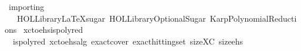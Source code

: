 %
\begin{isabellebody}%
%
%
\isadelimtheory
%
\endisadelimtheory
%
\isatagtheory
{}\isamarkupfalse%
\ importing\ \isanewline
\ \ \ {\isachardoublequoteopen}HOL{\isacharminus}{\kern0pt}Library{\isachardot}{\kern0pt}LaTeXsugar{\isachardoublequoteclose}\ {\isachardoublequoteopen}HOL{\isacharminus}{\kern0pt}Library{\isachardot}{\kern0pt}OptionalSugar{\isachardoublequoteclose}\ {\isachardoublequoteopen}Karp{}{}{\isachardot}{\kern0pt}Polynomial{\isacharunderscore}{\kern0pt}Reductions{\isachardoublequoteclose}\isanewline
{}%
\endisatagtheory
{\isafoldtheory}%
%
\isadelimtheory
\isanewline
%
\endisadelimtheory
\isanewline
\isanewline
{}\isamarkupfalse%
\ xc{\isacharunderscore}{\kern0pt}to{\isacharunderscore}{\kern0pt}ehs{\isacharunderscore}{\kern0pt}is{\isacharunderscore}{\kern0pt}polyred{\isacharcolon}{\kern0pt}\isanewline
\ \ {\isachardoublequoteopen}ispolyred\ xc{\isacharunderscore}{\kern0pt}to{\isacharunderscore}{\kern0pt}ehs{\isacharunderscore}{\kern0pt}alg\ exact{\isacharunderscore}{\kern0pt}cover\ exact{\isacharunderscore}{\kern0pt}hitting{\isacharunderscore}{\kern0pt}set\ size{\isacharunderscore}{\kern0pt}XC\ size{\isacharunderscore}{\kern0pt}ehs{\isachardoublequoteclose}\isanewline
%
\isadelimproof
\ \ %
\endisadelimproof
%
\isatagproof
{}\isamarkupfalse%
%
\endisatagproof
{\isafoldproof}%
%
\isadelimproof
\isanewline
%
\endisadelimproof
\isanewline
%
\isadelimtheory
\isanewline
%
\endisadelimtheory
%
\isatagtheory
{}\isamarkupfalse%
%
\endisatagtheory
{\isafoldtheory}%
%
\isadelimtheory
%
\endisadelimtheory
%
\end{isabellebody}%
\endinput
